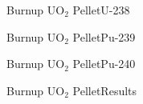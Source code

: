 \documentclass[sans,mathserif,aspectratio=169]{beamer}
\begin{document}
\begin{frame}{Burnup UO$_2$ Pellet}{U-238}
  \centering
\end{frame}

\begin{frame}{Burnup UO$_2$ Pellet}{Pu-239}
  \centering
\end{frame}

\begin{frame}{Burnup UO$_2$ Pellet}{Pu-240}
  \centering
\end{frame}

\begin{frame}{Burnup UO$_2$ Pellet}{Results}
  \centering
\end{frame}
\end{document}
